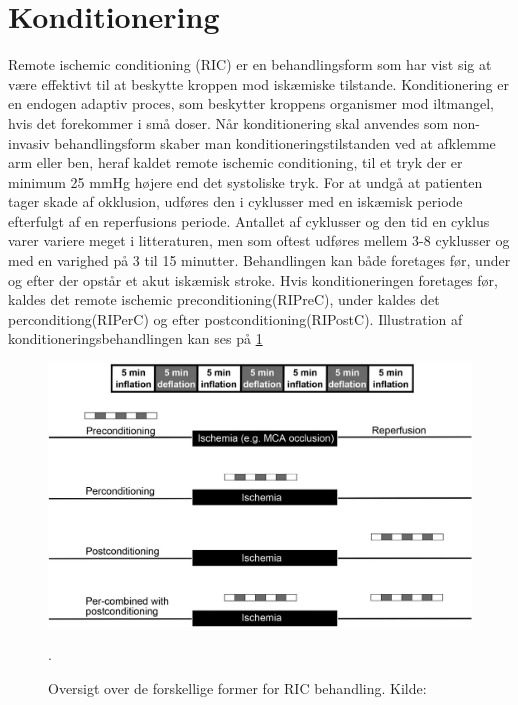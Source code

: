 \section{Konditionering}
Remote ischemic conditioning (RIC) er en behandlingsform som har vist sig at være effektivt til at beskytte kroppen mod iskæmiske tilstande. Konditionering er en endogen adaptiv proces, som beskytter kroppens organismer mod iltmangel, hvis det forekommer i små doser. Når konditionering skal anvendes som non-invasiv behandlingsform skaber man konditioneringstilstanden ved at afklemme arm eller ben, heraf kaldet remote ischemic conditioning, til et tryk der er minimum 25 mmHg højere end det systoliske tryk. For at undgå at patienten tager skade af okklusion, udføres den i cyklusser med en iskæmisk periode efterfulgt af en reperfusions periode. Antallet af cyklusser og den tid en cyklus varer variere meget i litteraturen, men som oftest udføres mellem 3-8 cyklusser og med en varighed på 3 til 15 minutter. \cite{RefWorks:3}
Behandlingen kan både foretages før, under og efter der opstår et akut iskæmisk stroke. Hvis konditioneringen foretages før, kaldes det remote ischemic preconditioning(RIPreC), under kaldes det perconditiong(RIPerC) og efter postconditioning(RIPostC). Illustration af konditioneringsbehandlingen kan ses på \ref{fig:cycles}

\begin{figure}[H]
	\includegraphics[width = \textwidth]{billeder/PrePerPostKonditionering.png}
	\caption{Oversigt over de forskellige former for RIC behandling. Kilde: \cite{RefWorks:3}}\label{fig:cycles}. 
\end{figure}

